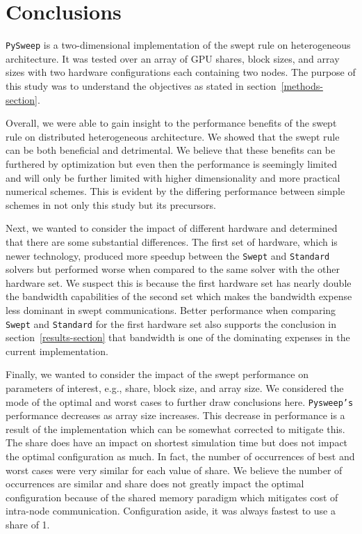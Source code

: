\documentclass[preprints,article,accept,moreauthors,pdftex]{Definitions/mdpi}
\def\pysweep{\texttt{PySweep}}
\def\Swept{\texttt{Swept}}
\def\Standard{\texttt{Standard}}
\begin{document}
\section{Conclusions}

\label{conclusions-section}
\pysweep{} is a two-dimensional implementation of the swept rule on heterogeneous architecture. It was tested over an array of GPU shares, block sizes, and array sizes with two hardware configurations each containing two nodes. The purpose of this study was to understand the objectives as stated in section~\ref{methods-section}.

Overall, we were able to gain insight to the performance benefits of the swept rule on distributed heterogeneous architecture. We showed that the swept rule can be both beneficial and detrimental. We believe that these benefits can be furthered by optimization but even then the performance is seemingly limited and will only be further limited with higher dimensionality and more practical numerical schemes. This is evident by the differing performance between simple schemes in not only this study but its precursors.

Next, we wanted to consider the impact of different hardware and determined that there are some substantial differences. The first set of hardware, which is newer technology, produced more speedup between the \Swept{} and \Standard{} solvers but performed worse when compared to the same solver with the other hardware set. We suspect this is because the first hardware set has nearly double the bandwidth capabilities of the second set which makes the bandwidth expense less dominant in swept communications. Better performance when comparing \Swept{} and \Standard{} for the first hardware set also supports the conclusion in section~\ref{results-section} that bandwidth is one of the dominating expenses in the current implementation.

Finally, we wanted to consider the impact of the swept performance on parameters of interest, e.g., share, block size, and array size. We considered the mode of the optimal and worst cases to further draw conclusions here. \texttt{Pysweep's} performance decreases as array size increases. This decrease in performance is a result of the implementation which can be somewhat corrected to mitigate this. The share does have an impact on shortest simulation time but does not impact the optimal configuration as much. In fact, the number of occurrences of best and worst cases were very similar for each value of share. We believe the number of occurrences are similar and share does not greatly impact the optimal configuration because of the shared memory paradigm which mitigates cost of intra-node communication. 
Configuration aside, it was always fastest to use a share of 1.
\end{document}
